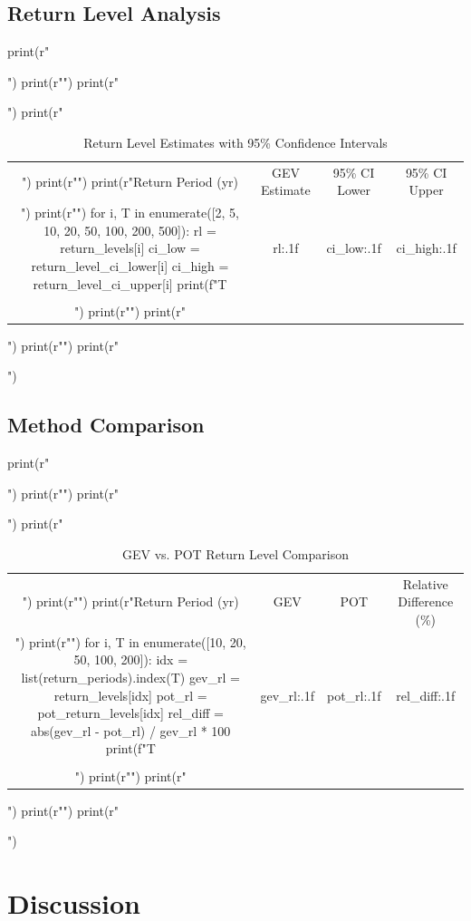 \documentclass[a4paper, 11pt]{article}
\begin{document}
\subsection{Return Level Analysis}

\begin{pycode}
print(r"\begin{table}[htbp]")
print(r"\centering")
print(r"\caption{Return Level Estimates with 95\% Confidence Intervals}")
print(r"\begin{tabular}{cccc}")
print(r"\toprule")
print(r"Return Period (yr) & GEV Estimate & 95\% CI Lower & 95\% CI Upper \\")
print(r"\midrule")
for i, T in enumerate([2, 5, 10, 20, 50, 100, 200, 500]):
    rl = return_levels[i]
    ci_low = return_level_ci_lower[i]
    ci_high = return_level_ci_upper[i]
    print(f"{T} & {rl:.1f} & {ci_low:.1f} & {ci_high:.1f} \\\\")
print(r"\bottomrule")
print(r"\end{tabular}")
print(r"\label{tab:returnlevels}")
print(r"\end{table}")
\end{pycode}

\subsection{Method Comparison}

\begin{pycode}
print(r"\begin{table}[htbp]")
print(r"\centering")
print(r"\caption{GEV vs. POT Return Level Comparison}")
print(r"\begin{tabular}{cccc}")
print(r"\toprule")
print(r"Return Period (yr) & GEV & POT & Relative Difference (\%) \\")
print(r"\midrule")
for i, T in enumerate([10, 20, 50, 100, 200]):
    idx = list(return_periods).index(T)
    gev_rl = return_levels[idx]
    pot_rl = pot_return_levels[idx]
    rel_diff = abs(gev_rl - pot_rl) / gev_rl * 100
    print(f"{T} & {gev_rl:.1f} & {pot_rl:.1f} & {rel_diff:.1f} \\\\")
print(r"\bottomrule")
print(r"\end{tabular}")
print(r"\label{tab:comparison}")
print(r"\end{table}")
\end{pycode}

\section{Discussion}
\end{document}
